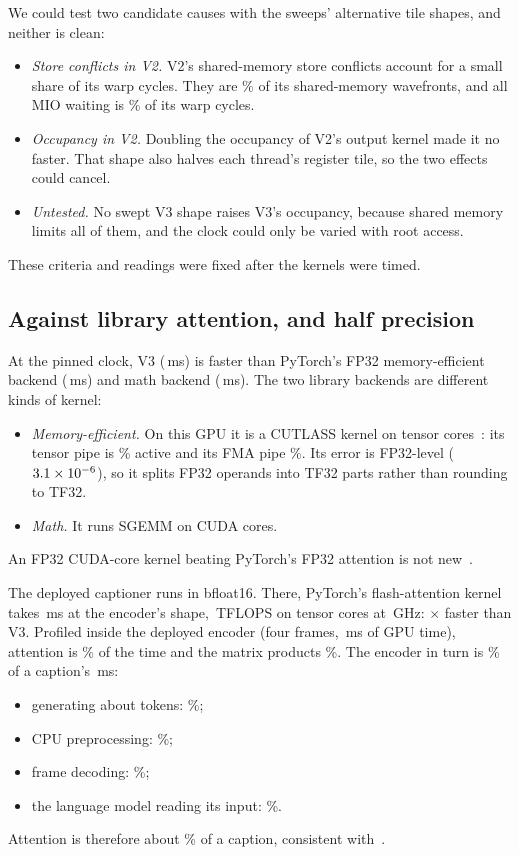 \documentclass[conference]{IEEEtran}
\begin{document}
We could test two candidate causes with the sweeps' alternative tile shapes, and neither is clean:
\begin{itemize}
\item \textit{Store conflicts in V2.} V2's shared-memory store conflicts account for a small share of its warp
cycles.
They are \VtwoConflictPct\% of its shared-memory wavefronts, and all MIO waiting is \VtwoMioPct\% of its warp cycles.
\item \textit{Occupancy in V2.} Doubling the occupancy of V2's output kernel made it no faster. That shape also
halves each thread's register tile, so the two effects could cancel.
\item \textit{Untested.} No swept V3 shape raises V3's occupancy, because shared memory limits all of them, and
the clock could only be varied with root access.
\end{itemize}
These criteria and readings were fixed after the kernels were timed.

\subsection{Against library attention, and half precision}
At the pinned clock, V3 (\PinVthreeMs\,ms) is faster than PyTorch's FP32 memory-efficient backend
(\PinBeffMs\,ms) and math backend (\PinBmathMs\,ms). The two library backends are different kinds of kernel:
\begin{itemize}
\item \textit{Memory-efficient.} On this GPU it is a CUTLASS kernel on tensor cores~\cite{pytorchsdpa}: its
tensor pipe is \BeffTensorPct\% active and its FMA pipe \BeffFmaPct\%. Its error is FP32-level
($3.1\times10^{-6}$), so it splits FP32 operands into TF32 parts rather than rounding to TF32.
\item \textit{Math.} It runs SGEMM on CUDA cores.
\end{itemize}
An FP32 CUDA-core kernel beating PyTorch's FP32 attention is not new~\cite{hsu2026elsa}.

The deployed captioner runs in bfloat16. There, PyTorch's flash-attention kernel takes \BfFlashMs\,ms at the
encoder's shape, \BfFlashTflops\,TFLOPS on tensor cores at \BfGhz\,GHz: \VthreeOverFlash$\times$ faster than V3.
Profiled inside the deployed encoder (four frames, \EncGpuMs\,ms of GPU time), attention is \EncAttnPct\% of
the time and the matrix products \EncMatmulPct\%. The encoder in turn is \EsEncPct\% of a caption's
\EsTotalMs\,ms:
\begin{itemize}
\item generating about \EsTokens{} tokens: \EsGenPct\%;
\item CPU preprocessing: \EsPrePct\%;
\item frame decoding: \EsDecPct\%;
\item the language model reading its input: \EsPrefillPct\%.
\end{itemize}
Attention is therefore about \AttnCaptionMeasPct\% of a caption, consistent with~\cite{hwang2025dejavu}.
\end{document}
